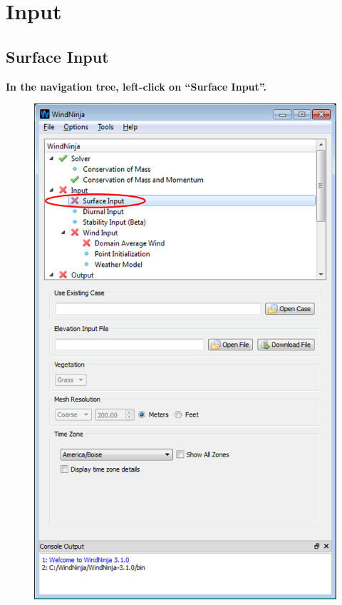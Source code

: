 \documentclass[12pt]{article}
\begin{document}
\section{Input}
\subsection{Surface Input}

\textbf{\color{red}In the navigation tree, left-click on “Surface Input”.}

\begin{figure}[H]
	\centering
	\label{}
	\includegraphics[scale=0.82]{layout_3.png}
\end{figure}
\end{document}
